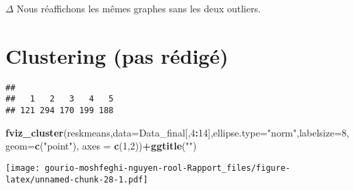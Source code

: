 \documentclass[
]{article}
\newenvironment{Shaded}{\begin{snugshade}}{\end{snugshade}}
\newcommand{\AttributeTok}[1]{\textcolor[rgb]{0.13,0.29,0.53}{#1}}
\newcommand{\DecValTok}[1]{\textcolor[rgb]{0.00,0.00,0.81}{#1}}
\newcommand{\FunctionTok}[1]{\textcolor[rgb]{0.13,0.29,0.53}{\textbf{#1}}}
\newcommand{\NormalTok}[1]{#1}
\newcommand{\OtherTok}[1]{\textcolor[rgb]{0.56,0.35,0.01}{#1}}
\newcommand{\SpecialCharTok}[1]{\textcolor[rgb]{0.81,0.36,0.00}{\textbf{#1}}}
\newcommand{\StringTok}[1]{\textcolor[rgb]{0.31,0.60,0.02}{#1}}
\begin{document}
\(\Delta\) Nous réaffichons les mêmes graphes sans les deux outliers.

\hypertarget{clustering-pas-ruxe9diguxe9}{%
\section{Clustering (pas rédigé)}\label{clustering-pas-ruxe9diguxe9}}

\begin{Shaded}
\end{Shaded}

\begin{verbatim}
## 
##   1   2   3   4   5 
## 121 294 170 199 188
\end{verbatim}

\begin{Shaded}
\begin{Highlighting}[]
\FunctionTok{fviz\_cluster}\NormalTok{(reskmeans,}\AttributeTok{data=}\NormalTok{Data\_final[,}\DecValTok{4}\SpecialCharTok{:}\DecValTok{14}\NormalTok{],}\AttributeTok{ellipse.type=}\StringTok{"norm"}\NormalTok{,}\AttributeTok{labelsize=}\DecValTok{8}\NormalTok{,}\AttributeTok{geom=}\FunctionTok{c}\NormalTok{(}\StringTok{"point"}\NormalTok{), }\AttributeTok{axes =} \FunctionTok{c}\NormalTok{(}\DecValTok{1}\NormalTok{,}\DecValTok{2}\NormalTok{))}\SpecialCharTok{+}\FunctionTok{ggtitle}\NormalTok{(}\StringTok{""}\NormalTok{)}
\end{Highlighting}
\end{Shaded}

\texttt{[image: gourio-moshfeghi-nguyen-rool-Rapport\_files/figure-latex/unnamed-chunk-28-1.pdf]}

\begin{Shaded}
\end{Shaded}
\end{document}
